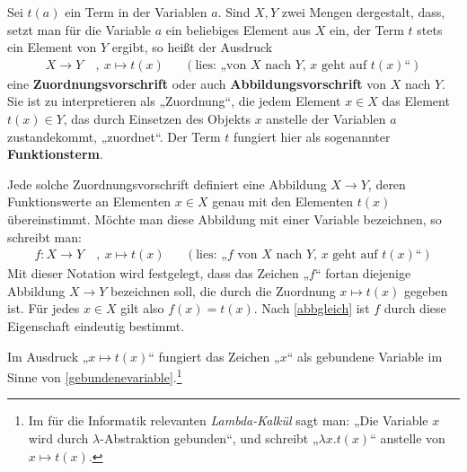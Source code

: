\begin{nota} \label{def:zuordnung}   
    Sei $t(a)$ ein Term in der Variablen $a$. Sind $X,Y$ zwei Mengen dergestalt, dass, setzt man für die Variable $a$ ein beliebiges Element aus $X$ ein, der Term $t$ stets ein Element von $Y$ ergibt, so heißt der Ausdruck
    \begin{align*}
        X \to Y \ &,\ x\mapsto t(x) && (\text{lies: „von $X$ nach $Y$, $x$ geht auf $t(x)$“})
    \end{align*}
    eine \textbf{Zuordnungsvorschrift} oder auch \textbf{Abbildungsvorschrift} von $X$ nach $Y$. Sie ist zu interpretieren als „Zuordnung“, die jedem Element $x\in X$ das Element $t(x)\in Y$, das durch Einsetzen des Objekts $x$ anstelle der Variablen $a$ zustandekommt, „zuordnet“. Der Term $t$ fungiert hier als sogenannter \textbf{Funktionsterm}.
    
    Jede solche Zuordnungsvorschrift definiert eine Abbildung $X\to Y$, deren Funktionswerte an Elementen $x\in X$ genau mit den Elementen $t(x)$ übereinstimmt. Möchte man diese Abbildung mit einer Variable bezeichnen, so schreibt man:
    \begin{align*}
        f : X\to Y \ & ,\ x\mapsto t(x) && (\text{lies: „$f$ von $X$ nach $Y$, $x$ geht auf $t(x)$“})
    \end{align*}
    Mit dieser Notation wird festgelegt, dass das Zeichen „$f$“ fortan diejenige Abbildung $X\to Y$ bezeichnen soll, die durch die Zuordnung $x\mapsto t(x)$ gegeben ist. Für jedes $x\in X$ gilt also $f(x)=t(x)$. Nach \cref{abbgleich} ist $f$ durch diese Eigenschaft eindeutig bestimmt.

    Im Ausdruck „$x\mapsto t(x)$“ fungiert das Zeichen „$x$“ als gebundene Variable im Sinne von \cref{gebundenevariable}.\footnote{Im für die Informatik relevanten \emph{Lambda-Kalkül} sagt man: „Die Variable $x$ wird durch $\lambda$-Abstraktion gebunden“, und schreibt „$\lambda x.t(x)$“ anstelle von $x\mapsto t(x)$.}
\end{nota}


